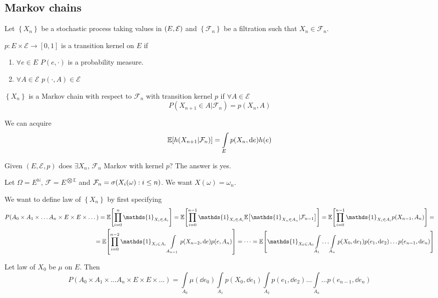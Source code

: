 \subsection{Markov chains}

Let $\left\{ X_n \right\}$ be a stochastic process taking values in $\qty(E, \mathcal{E})$ and $\left\{ \mathcal{F}_n\right\}$ be a filtration such that $X_n\in \mathcal{F}_n$. 
\begin{definition}
	$p: E\times \mathcal{E} \to [0,1]$ is a transition kernel on $E$ if 
	\begin{enumerate}
		\item $\forall e\in E$ $P(e,\cdot)$ is a probability measure.
		\item $\forall A\in \mathcal{E}$ $p(\cdot, A) \in \mathcal{E}$
	\end{enumerate}
\end{definition}
\begin{definition}
$\left\{ X_n \right\}$ is a Markov chain with respect to $\mathcal{F}_n$ with transition kernel $p$ if 
$\forall A\in \mathcal{E}$
$$P(X_{n+1} \in A | \mathcal{F}_n) = p(X_n,A)$$

\end{definition}
We can acquire $$\mathbb{E}\qty[h(X_{n+1}|\mathcal{F}_n)] = \int\limits_E p(X_n, \dd{e}) h(e)$$


Given $(E, \mathcal{E}, p)$ does $\exists X_n$, $\mathcal{F}_n$ Markov with kernel $p$? The answer is yes.

Let $\Omega = E^{\mathbb{N}}$, $\mathcal{F} = E^{\bigotimes \mathbb{E}}$ and $\mathcal{F}_n = \sigma\qty(X_i(\omega) : i\leq n)$. We want
$X(\omega) = \omega_n$. 

 We want to define law of $\left\{ X_n \right\}$ by first specifying 
 \begin{align*}
 P(A_0 \times A_1\times \dots A_n \times E \times E \times \dots) = \mathbb{E} \qty[\prod_{i=0}^n \mathds{1}_{X_i\in A_i}] = \mathbb{E} \qty[\prod_{i=0}^{n-1} \mathds{1}_{X_i\in A_i} \mathbb{E} \qty[\mathds{1}_{X_n\in A_n} | \mathcal{F}_{n-1}]] = \mathbb{E} \qty[\prod_{i=0}^{n-1} \mathds{1}_{X_i\in A_i} p(X_{n-1}, A_n)] =\\= \mathbb{E} \qty[\prod_{i=0}^{n-2} \mathds{1}_{X_i\in A_i} \int\limits_{A_{n-1}} p(X_{n-2}, \dd{e})p(e, A_n)] =\dots = \mathbb{E} \qty[\mathds{1}_{X_0\in A_0} \int\limits_{A_1} \dots \int\limits_{A_n} p(X_0, \dd{e_1})p(e_1, \dd{e_2})\dots p(e_{n-1}, \dd{e_n})]
 \end{align*}

Let law of $X_0$ be $\mu$ on $E$. Then
$$P(A_0 \times A_1\times \dots A_n \times E \times E \times \dots) = \int\limits_{A_0} \mu(\dd{e_0}) \int\limits_{A_1}  p(X_0, \dd{e_1})  \int\limits_{A_2}  p(e_1, \dd{e_2}) \dots \int\limits_{A_n}\dots p(e_{n-1}, \dd{e_n}) $$

